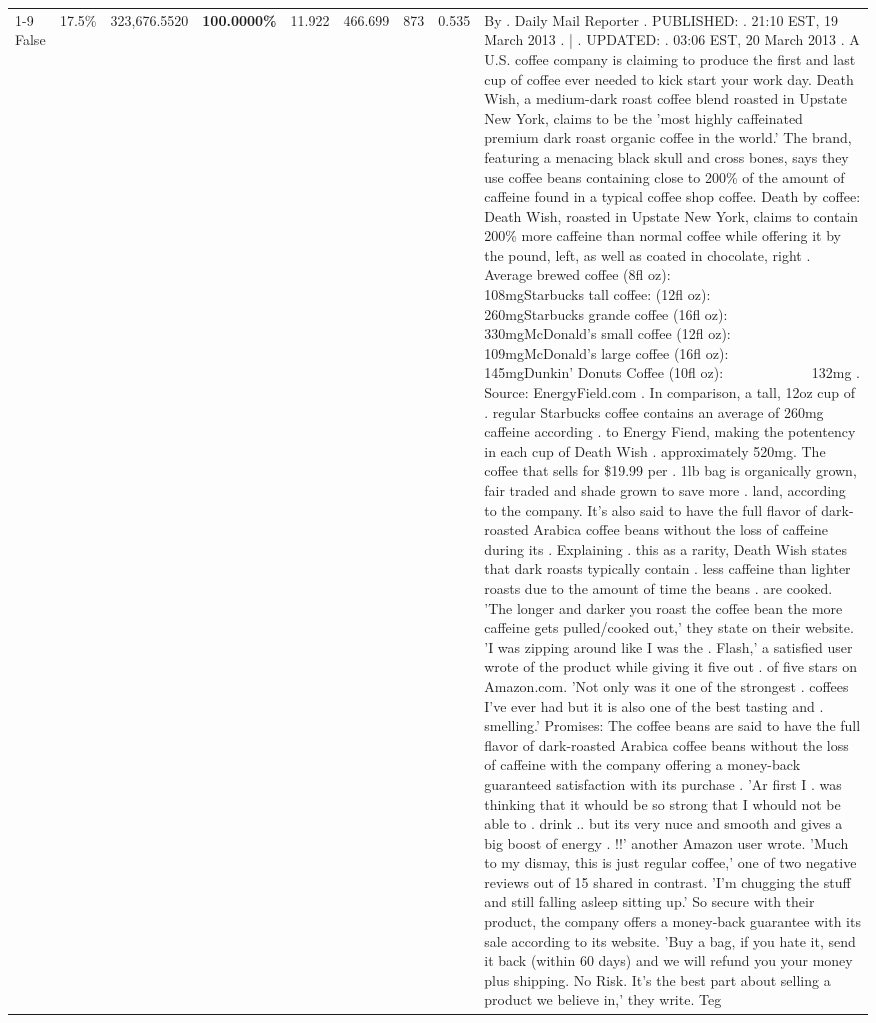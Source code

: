 \begin{table}[H]
{\begin{tabular}{lllrlllll}
\cline{1-9}
False & 17.5\% & 323,676.5520 & \bfseries \color{red} 100.0000\% & 11.922 & 466.699 & 873 & 0.535 & By . Daily Mail Reporter . PUBLISHED: . 21:10 EST, 19 March 2013 . | . UPDATED: . 03:06 EST, 20 March 2013 . A U.S. coffee company is claiming to produce the first and last cup of coffee ever needed to kick start your work day. Death Wish, a medium-dark roast coffee blend roasted in Upstate New York, claims to be the 'most highly caffeinated premium dark roast organic coffee in the world.' The brand, featuring a menacing black skull and cross bones, says they use coffee beans containing close to 200\% of the amount of caffeine found in a typical coffee shop coffee. Death by coffee: Death Wish, roasted in Upstate New York, claims to contain 200\% more caffeine than normal coffee while offering it by the pound, left, as well as coated in chocolate, right . Average brewed coffee (8fl oz):              108mgStarbucks tall coffee: (12fl oz):                260mgStarbucks grande coffee (16fl oz):         330mgMcDonald's small coffee (12fl oz):           109mgMcDonald's large coffee (16fl oz):           145mgDunkin' Donuts Coffee (10fl oz):             132mg . Source: EnergyField.com . In comparison, a tall, 12oz cup of . regular Starbucks coffee contains an average of 260mg caffeine according . to Energy Fiend, making the potentency in each cup of Death Wish . approximately 520mg. The coffee that sells for \$19.99 per . 1lb bag is organically grown, fair traded and shade grown to save more . land, according to the company. It's also said to have the full flavor of dark-roasted Arabica coffee beans without the loss of caffeine during its . Explaining . this as a rarity, Death Wish states that dark roasts typically contain . less caffeine than lighter roasts due to the amount of time the beans . are cooked. 'The longer and darker you roast the coffee bean the more caffeine gets pulled/cooked out,' they state on their website. 'I was zipping around like I was the . Flash,' a satisfied user wrote of the product while giving it five out . of five stars on Amazon.com. 'Not only was it one of the strongest . coffees I've ever had but it is also one of the best tasting and . smelling.’ Promises: The coffee beans are said to have the full flavor of dark-roasted Arabica coffee beans without the loss of caffeine with the company offering a money-back guaranteed satisfaction with its purchase . 'Ar first I . was thinking that it whould be so strong that I whould not be able to . drink .. but its very nuce and smooth and gives a big boost of energy . !!' another Amazon user wrote. 'Much to my dismay, this is just regular coffee,' one of two negative reviews out of 15 shared in contrast. 'I'm chugging the stuff and still falling asleep sitting up.' So secure with their product, the company offers a money-back guarantee with its sale according to its website. 'Buy a bag, if you hate it, send it back (within 60 days) and we will refund you your money plus shipping. No Risk. It’s the best part about selling a product we believe in,' they write. Teg \\

\end{tabular}}
\end{table}
